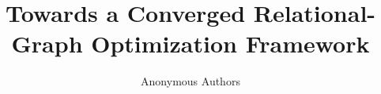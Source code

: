 \documentclass[sigconf,nonacm]{acmart}
\begin{document}
\title{Towards a Converged Relational-Graph Optimization Framework}

\author{Anonymous Authors}





\keywords{}

\maketitle



%
%


%
%






\end{document}
